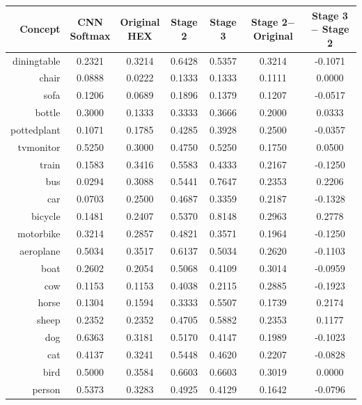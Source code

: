 \documentclass[11pt,a4paper]{book}
\begin{document}
\begin{table}[htbp]
\centering
\begin{tabular}{r|c|c|c|c|c|c}
Concept & \makecell{CNN\\Softmax} & \makecell{Original\\HEX} & Stage 2 & Stage 3 & \makecell{Stage 2$-$\\Original} & \makecell{Stage 3$-$\\Stage 2}\\\hline
diningtable   & 0.2321 & 0.3214 & 0.6428 & 0.5357 & 0.3214 & -0.1071\\
chair         & 0.0888 & 0.0222 & 0.1333 & 0.1333 & 0.1111 & 0.0000\\
sofa          & 0.1206 & 0.0689 & 0.1896 & 0.1379 & 0.1207 & -0.0517\\
bottle        & 0.3000 & 0.1333 & 0.3333 & 0.3666 & 0.2000 & 0.0333\\
pottedplant   & 0.1071 & 0.1785 & 0.4285 & 0.3928 & 0.2500 & -0.0357\\
tvmonitor     & 0.5250 & 0.3000 & 0.4750 & 0.5250 & 0.1750 & 0.0500\\
train         & 0.1583 & 0.3416 & 0.5583 & 0.4333 & 0.2167 & -0.1250\\
bus           & 0.0294 & 0.3088 & 0.5441 & 0.7647 & 0.2353 & 0.2206\\
car           & 0.0703 & 0.2500 & 0.4687 & 0.3359 & 0.2187 & -0.1328\\
bicycle       & 0.1481 & 0.2407 & 0.5370 & 0.8148 & 0.2963 & 0.2778\\
motorbike     & 0.3214 & 0.2857 & 0.4821 & 0.3571 & 0.1964 & -0.1250\\
aeroplane     & 0.5034 & 0.3517 & 0.6137 & 0.5034 & 0.2620 & -0.1103\\
boat          & 0.2602 & 0.2054 & 0.5068 & 0.4109 & 0.3014 & -0.0959\\
cow           & 0.1153 & 0.1153 & 0.4038 & 0.2115 & 0.2885 & -0.1923\\
horse         & 0.1304 & 0.1594 & 0.3333 & 0.5507 & 0.1739 & 0.2174\\
sheep         & 0.2352 & 0.2352 & 0.4705 & 0.5882 & 0.2353 & 0.1177\\
dog           & 0.6363 & 0.3181 & 0.5170 & 0.4147 & 0.1989 & -0.1023\\
cat           & 0.4137 & 0.3241 & 0.5448 & 0.4620 & 0.2207 & -0.0828\\
bird          & 0.5000 & 0.3584 & 0.6603 & 0.6603 & 0.3019 & 0.0000\\
person        & 0.5373 & 0.3283 & 0.4925 & 0.4129 & 0.1642 & -0.0796\\\hline

\end{tabular}
\end{table}
\end{document}
